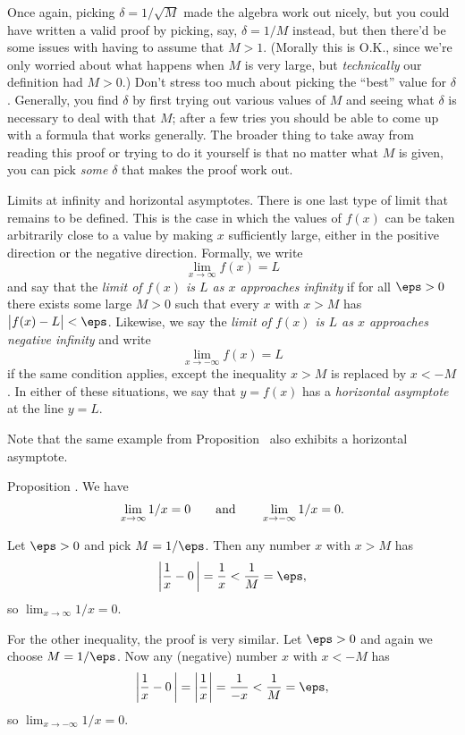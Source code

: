 Once again, picking $\delta = 1/\sqrt M$ made the algebra work out nicely, but you could have written
a valid proof by picking, say, $\delta = 1/M$ instead, but then there'd be some issues with having to
assume that $M>1$. (Morally this
is {\mc O.K.}, since we're only worried about what happens when $M$ is very large, but {\it technically}
our definition had $M>0$.)
Don't stress too much about picking the ``best''
value for $\delta$. Generally, you find $\delta$ by first trying out various values of $M$ and seeing what
$\delta$ is necessary to deal with that $M$; after a few tries you should be able to come up with a formula
that works generally. The broader thing to take away from reading this proof or trying to do it yourself
is that no matter what $M$ is given, you can
pick {\it some} $\delta$ that makes the proof work out.


\medskip\boldlabel {} Limits at infinity and horizontal asymptotes.
There is one last type of limit that remains to be defined. This is the case in which the values of
$f(x)$ can be taken arbitrarily close to a value by making $x$ sufficiently large, either in the positive
direction or the negative direction. Formally, we write
$$\lim_{x\to \infty} f(x) = L$$
and say that the {\it limit of $f(x)$ is $L$ as $x$ approaches infinity} if for all $\eps > 0$
there exists some large $M>0$ such that every $x$ with $x>M$ has $\bigl| f(x) - L\bigr| < \eps$.
Likewise, we say the {\it limit of $f(x)$ is $L$ as $x$ approaches negative infinity} and write
$$\lim_{x\to -\infty} f(x) = L$$
if the same condition applies, except the inequality $x>M$ is replaced by $x<-M$.
In either of these situations, we say that $y=f(x)$ has a {\it horizontal asymptote} at the line
$y=L$.

Note that the same example from Proposition~{\propvertasymp} also exhibits a horizontal asymptote.

\edef\prophorasymp{\the\thmcount}
\proclaim Proposition \advthm. We have
$$\lim_{x\to \infty} 1/x = 0\qquad\hbox{and}\qquad \lim_{x\to-\infty} 1/x = 0.$$

\proof Let $\eps >0$ and pick $M = 1/\eps$. Then any number $x$ with $x>M$ has
$$\biggl|{1\over x} - 0\,\biggr| = {1\over x} < {1\over M} = \eps,$$
so $\lim_{x\to \infty} 1/x = 0$.

For the other inequality, the proof is very similar. Let $\eps > 0$ and again we choose $M = 1/\eps$.
Now any (negative) number $x$ with $x < -M$ has
$$\biggl|{1\over x} - 0\,\biggr| = \biggl|{1\over x}\biggr| = {1\over -x} < {1\over M} = \eps,$$
so $\lim_{x\to -\infty} 1/x = 0$.\slug

